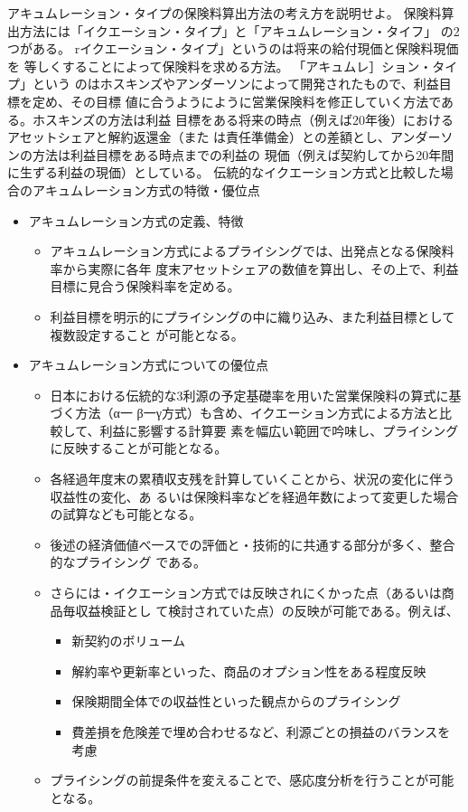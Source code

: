\documentclass[report,gutter=10mm,fore-edge=10mm,uplatex,dvipdfmx]{jlreq}
\begin{document}
アキュムレーション・タイプの保険料算出方法の考え方を説明せよ。
保険料算出方法には「イクエーション・タイプ」と「アキュムレーション・タイフ」
の2つがある。
rイクエーション・タイプ」というのは将来の給付現価と保険料現価を
等しくすることによって保険料を求める方法。
「アキュムレ］ション・タイプ」という
のはホスキンズやアンダーソンによって開発されたもので、利益目標を定め、その目標
値に合うようにように営業保険料を修正していく方法である。ホスキンズの方法は利益
目標をある将来の時点（例えば20年後）におけるアセットシェアと解約返還金（また
は責任準備金）との差額とし、アンダーソンの方法は利益目標をある時点までの利益の
現価（例えば契約してから20年間に生ずる利益の現価）としている。
伝統的なイクエーション方式と比較した場合のアキュムレーション方式の特徴・優位点
\begin{itemize}
 \item アキュムレーション方式の定義、特徴
\begin{itemize}
 \item  アキュムレーション方式によるプライシングでは、出発点となる保険料率から実際に各年
度末アセットシェアの数値を算出し、その上で、利益目標に見合う保険料率を定める。
 \item  利益目標を明示的にプライシングの中に織り込み、また利益目標として複数設定すること
が可能となる。
\end{itemize}
 \item アキュムレーション方式についての優位点
\begin{itemize}
 \item  日本における伝統的な3利源の予定基礎率を用いた営業保険料の算式に基づく方法（α一
β一γ方式）も含め、イクエーション方式による方法と比較して、利益に影響する計算要
素を幅広い範囲で吟味し、プライシングに反映することが可能となる。
 \item 各経過年度末の累積収支残を計算していくことから、状況の変化に伴う収益性の変化、あ
るいは保険料率などを経過年数によって変更した場合の試算なども可能となる。
 \item 後述の経済価値べ一スでの評価と・技術的に共通する部分が多く、整合的なプライシング
である。
 \item さらには・イクエーション方式では反映されにくかった点（あるいは商品毎収益検証とし
て検討されていた点）の反映が可能である。例えば、
\begin{itemize}
 \item 新契約のボリューム
 \item 解約率や更新率といった、商品のオプション性をある程度反映
 \item 保険期間全体での収益性といった観点からのプライシング
 \item 費差損を危険差で埋め合わせるなど、利源ごとの損益のバランスを考慮
\end{itemize}
 \item プライシングの前提条件を変えることで、感応度分析を行うことが可能となる。
\end{itemize}
\end{itemize}
 
\end{document}
